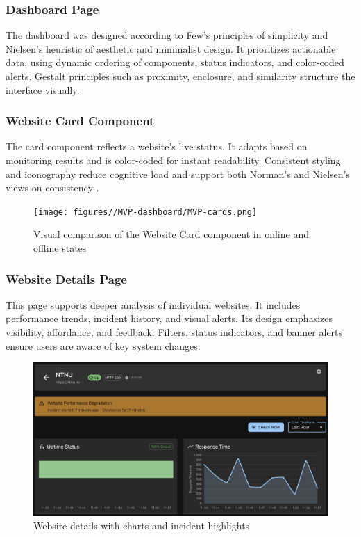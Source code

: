 \subsubsection{Dashboard Page}
\label{subsubsec:dashboard_results}

The dashboard was designed according to Few’s principles of simplicity and Nielsen's heuristic of aesthetic and minimalist design. It prioritizes actionable data, using dynamic ordering of components, status indicators, and color-coded alerts. Gestalt principles such as proximity, enclosure, and similarity structure the interface visually.

\subsubsection{Website Card Component}
\label{subsubsec:website_card_results}

The card component reflects a website’s live status. It adapts based on monitoring results and is color-coded for instant readability. Consistent styling and iconography reduce cognitive load and support both Norman's and Nielsen’s views on consistency  .

\begin{figure}[H]
    \centering
    \texttt{[image: figures//MVP-dashboard/MVP-cards.png]}
    \caption{Visual comparison of the Website Card component in online and offline states}
    \label{fig:websitecard-comparison}
\end{figure}

\subsubsection{Website Details Page}
\label{subsubsec:website_details_results}

This page supports deeper analysis of individual websites. It includes performance trends, incident history, and visual alerts. Its design emphasizes visibility, affordance, and feedback. Filters, status indicators, and banner alerts ensure users are aware of key system changes.

\begin{figure}[H]
    \centering
    \includegraphics[width=1\linewidth]{figures/websiteDetails.png}
    \caption{Website details with charts and incident highlights}
\end{figure}

